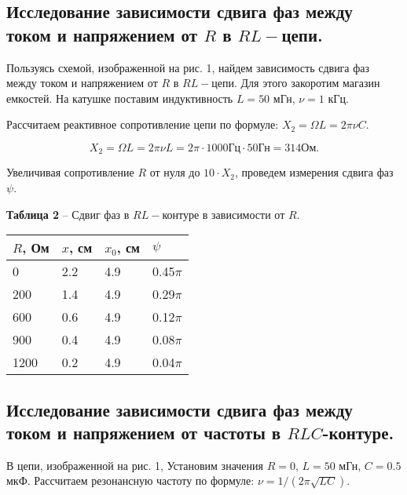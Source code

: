 \documentclass[12pt,a4paper]{article}
\begin{document}
    \subsection{Исследование зависимости сдвига фаз между током и напряжением от $R$ в $RL-$цепи.}
        Пользуясь схемой, изображенной на рис. 1, найдем зависимость сдвига фаз между током и напряжением от $R$ в $RL-$цепи. Для этого закоротим магазин емкостей. На катушке поставим индуктивность $L = 50$ мГн, $\nu = 1$ кГц.
        
        Рассчитаем реактивное сопротивление цепи по формуле: $X_2 = \Omega L = 2 \pi \nu C$. 
        
        \[
        X_2 = \Omega L = 2 \pi \nu L = 2 \pi \cdot 1000 \text{Гц}\cdot 50\text{Гн} = 314 \text{Ом}.
        \]
        
        Увеличивая сопротивление $R$ от нуля до $10 \cdot X_2$, проведем измерения сдвига фаз $\psi$.
        
        \begin{table}[!h]
        \begin{flushleft}%
       		\textbf{Таблица 2} -- Сдвиг фаз в $RL-$контуре в зависимости от  $R$.\\
        \end{flushleft}
            \begin{center}
                \begin{tabular}{ | l | l | l | l |}
                    \hline
                    $R$, Ом &   $x$, см &  $x_0$, см&   $\psi$      \\
                    \hline
                    0       &   2.2     &   4.9     &   0.45$\pi$   \\
                    200     &   1.4     &   4.9     &   0.29$\pi$   \\
                    600     &   0.6     &   4.9     &   0.12$\pi$   \\
                    900     &   0.4     &   4.9     &   0.08$\pi$  \\
                    1200    &   0.2     &   4.9     &   0.04$\pi$  \\
                    \hline                
                \end{tabular}
            \end{center}
        \end{table}
        
    \subsection{Исследование зависимости сдвига фаз между током и напряжением от частоты в $RLC$-контуре.}
        В цепи, изображенной на рис. 1, Установим значения $R = 0$, $L = 50$ мГн, $C = 0.5$ мкФ. Рассчитаем резонансную частоту по формуле: $\nu = 1/(2 \pi \sqrt{LC})$.
        
\end{document}
